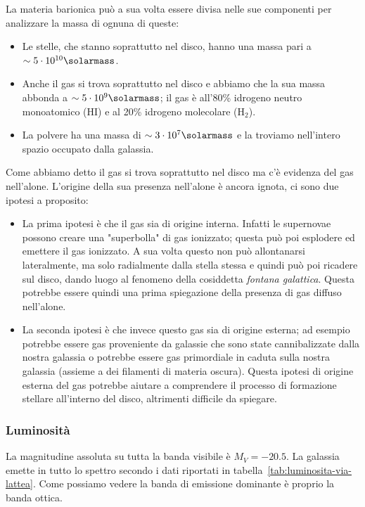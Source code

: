 La materia barionica può a sua volta essere divisa nelle sue componenti per analizzare la massa di ognuna di queste:
\begin{itemize}
    \item Le stelle, che stanno soprattutto nel disco, hanno una massa pari a $\sim 5 \cdot 10^{10} \si{\solarmass}$.
    \item Anche il gas si trova soprattutto nel disco e abbiamo che la sua massa abbonda a $\sim 5 \cdot 10^9 \si{\solarmass}$; il gas è all'80\% idrogeno neutro monoatomico (HI) e al 20\% idrogeno molecolare (H$_{2}$). 
    \item La polvere ha una massa di $\sim 3 \cdot 10^7 \si{\solarmass}$ e la troviamo nell'intero spazio occupato dalla galassia.
\end{itemize}

Come abbiamo detto il gas si trova soprattutto nel disco ma c’è evidenza del gas nell’alone. L’origine della sua presenza nell'alone è ancora ignota, ci sono due ipotesi a proposito:
\begin{itemize}
    \item La prima ipotesi è che il gas sia di origine interna. Infatti le supernovae possono creare una "superbolla" di gas ionizzato; questa può poi esplodere ed emettere il gas ionizzato. A sua volta questo non può allontanarsi lateralmente, ma solo radialmente dalla stella stessa e quindi può poi ricadere sul disco, dando luogo al fenomeno della cosiddetta \emph{fontana galattica}. Questa potrebbe essere quindi una prima spiegazione della presenza di gas diffuso nell'alone.
    \item La seconda ipotesi è che invece questo gas sia di origine esterna; ad esempio potrebbe essere gas proveniente da galassie che sono state cannibalizzate dalla nostra galassia o potrebbe essere gas primordiale in caduta sulla nostra galassia (assieme a dei filamenti di materia oscura).  Questa ipotesi di origine esterna del gas potrebbe aiutare a comprendere il processo di formazione stellare all'interno del disco, altrimenti difficile da spiegare.
\end{itemize} 

\subsubsection{Luminosità}
La magnitudine assoluta su tutta la banda visibile è $M_V = -20.5$. La galassia emette in tutto lo spettro secondo i dati riportati in tabella~\ref{tab:luminosita-via-lattea}. Come possiamo vedere la banda di emissione dominante è proprio la banda ottica.

